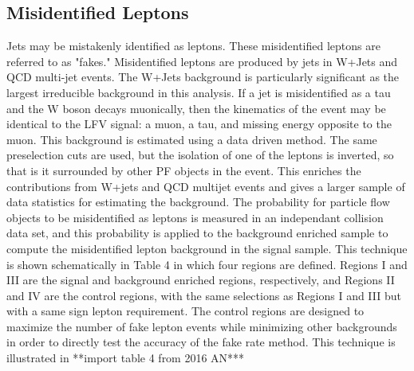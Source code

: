 \documentclass[oneside, letterpaper, oldfontcommands]{memoir}
\begin{document}
{\subsection{Misidentified Leptons}
\qquad Jets may be mistakenly identified as leptons. These misidentified leptons are referred to as "fakes." Misidentified leptons are produced by jets in W+Jets and QCD multi-jet events. The W+Jets background is particularly significant as the largest irreducible background in this analysis. If a jet is misidentified as a tau and the W boson decays muonically, then the kinematics of the event may be identical to the LFV signal: a muon, a tau, and missing energy opposite to the muon. This background is estimated using a data driven method. The same preselection cuts are used, but the isolation of one of the leptons is inverted, so that is it surrounded by other PF objects in the event. This enriches the contributions from W+jets and QCD multijet events and gives a larger sample of data statistics for estimating the background. The probability for particle flow objects to be misidentified as leptons is measured in an independant collision data set, and this probability is applied to the background enriched sample to compute the misidentified lepton background in the signal sample. This technique is shown schematically in Table 4 in which four regions are defined. Regions I and III are the signal and background enriched regions, respectively, and Regions II and IV are the control regions, with the same selections as Regions I and III but with a same sign lepton requirement. The control regions are designed to maximize the number of fake lepton events while minimizing other backgrounds in order to directly test the accuracy of the fake rate method. This technique is illustrated in **import table 4 from 2016 AN***

}
\end{document}
